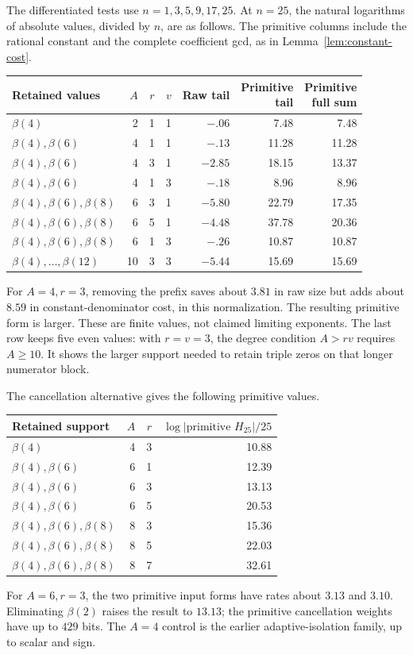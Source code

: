 The differentiated tests use $n=1,3,5,9,17,25$. At $n=25$, the
natural logarithms of absolute values, divided by $n$, are as follows.
The primitive columns include the rational constant and the complete
coefficient gcd, as in Lemma~\ref{lem:constant-cost}.
\begin{center}
\begin{tabular}{@{}lrrrrrr@{}}
\toprule
Retained values&$A$&$r$&$v$&Raw tail&\shortstack{Primitive\\tail}&\shortstack{Primitive\\full sum}\\
\midrule
$\beta(4)$&2&1&1&$-.06$&7.48&7.48\\
$\beta(4),\beta(6)$&4&1&1&$-.13$&11.28&11.28\\
$\beta(4),\beta(6)$&4&3&1&$-2.85$&18.15&13.37\\
$\beta(4),\beta(6)$&4&1&3&$-.18$&8.96&8.96\\
$\beta(4),\beta(6),\beta(8)$&6&3&1&$-5.80$&22.79&17.35\\
$\beta(4),\beta(6),\beta(8)$&6&5&1&$-4.48$&37.78&20.36\\
$\beta(4),\beta(6),\beta(8)$&6&1&3&$-.26$&10.87&10.87\\
$\beta(4),\ldots,\beta(12)$&10&3&3&$-5.44$&15.69&15.69\\
\bottomrule
\end{tabular}
\end{center}
For $A=4,r=3$, removing the prefix saves about $3.81$ in raw size
but adds about $8.59$ in constant-denominator cost, in this normalization.
The resulting primitive form is larger. These are finite values, not
claimed limiting exponents.
The last row keeps five even values: with $r=v=3$, the degree condition
$A>rv$ requires $A\ge10$. It shows the larger support needed to retain
triple zeros on that longer numerator block.

The cancellation alternative gives the following primitive values.
\begin{center}
\begin{tabular}{lrrr}
\toprule
Retained support&$A$&$r$&$\log|\text{primitive }H_{25}|/25$\\
\midrule
$\beta(4)$&4&3&10.88\\
$\beta(4),\beta(6)$&6&1&12.39\\
$\beta(4),\beta(6)$&6&3&13.13\\
$\beta(4),\beta(6)$&6&5&20.53\\
$\beta(4),\beta(6),\beta(8)$&8&3&15.36\\
$\beta(4),\beta(6),\beta(8)$&8&5&22.03\\
$\beta(4),\beta(6),\beta(8)$&8&7&32.61\\
\bottomrule
\end{tabular}
\end{center}
For $A=6,r=3$, the two primitive input forms have rates about
$3.13$ and $3.10$. Eliminating $\beta(2)$ raises the result to $13.13$;
the primitive cancellation weights have up to $429$ bits. The $A=4$
control is the earlier adaptive-isolation family, up to scalar and sign.


